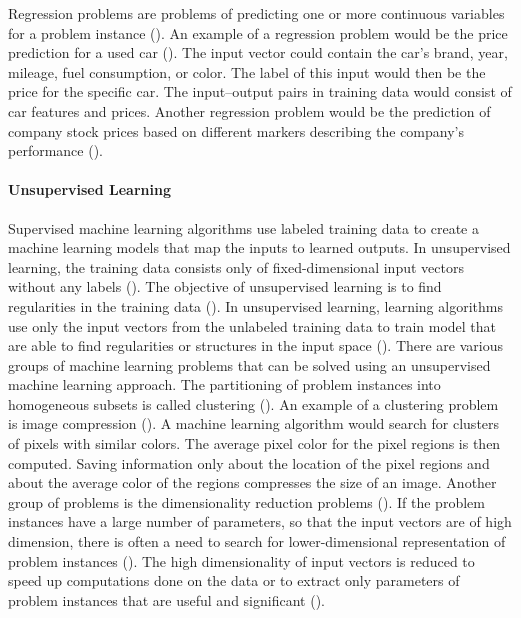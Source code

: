 \documentclass{BachelorBUI}
\begin{document}
                Regression problems are problems of predicting one or more continuous variables for a problem instance (\cite{Bishop:2006}). An example of a regression problem would be the price prediction for a used car (\cite{Alpaydin:2014}). The input vector could contain the car's brand, year, mileage, fuel consumption, or color. The label of this input would then be the price for the specific car. The input--output pairs in training data would consist of car features and prices. Another regression problem would be the prediction of company stock prices based on different markers describing the company's performance (\cite{Mohri:2018}).

            \paragraph{Unsupervised Learning}

                Supervised machine learning algorithms use labeled training data to create a machine learning models that map the inputs  to learned outputs. In unsupervised learning, the training data consists only of fixed-dimensional input vectors without any labels (\cite{Bishop:2006}). The objective of unsupervised learning is to find regularities in the training data (\cite{Alpaydin:2014}). In unsupervised learning, learning algorithms use only the input vectors from the unlabeled training data to train model that are able to find regularities or structures in the input space (\cite{Alpaydin:2014}). There are various groups of machine learning problems that can be solved using an unsupervised machine learning approach. The partitioning of problem instances into homogeneous subsets is called clustering (\cite{Mohri:2018}). An example of a clustering problem is image compression (\cite{Alpaydin:2014}). A machine learning algorithm would search for clusters of pixels with similar colors. The average pixel color for the pixel regions is then computed. Saving information only about the location of the pixel regions and about the average color of the regions compresses the size of an image. Another group of problems is the dimensionality reduction problems (\cite{Mohri:2018}). If the problem instances have a large number of parameters, so that the input vectors are of high dimension, there is often a need to search for lower-dimensional representation of problem instances (\cite{Mohri:2018}). The high dimensionality of input vectors is reduced to speed up computations done on the data or to extract only parameters of problem instances that are useful and significant (\cite{Mohri:2018}). 
\end{document}
